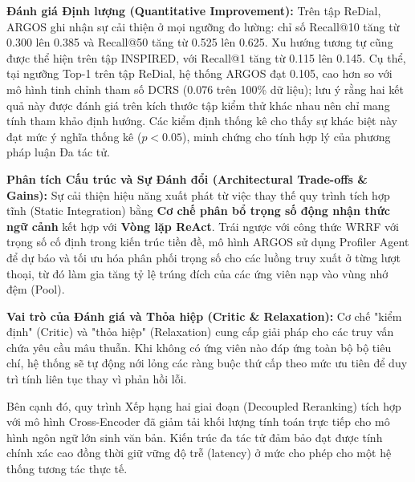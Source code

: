 \textbf{Đánh giá Định lượng (Quantitative Improvement):}
Trên tập ReDial, ARGOS ghi nhận sự cải thiện ở mọi ngưỡng đo lường: chỉ số Recall@10 tăng từ 0.300 lên 0.385 và Recall@50 tăng từ 0.525 lên 0.625. Xu hướng tương tự cũng được thể hiện trên tập INSPIRED, với Recall@1 tăng từ 0.115 lên 0.145. Cụ thể, tại ngưỡng Top-1 trên tập ReDial, hệ thống ARGOS đạt 0.105, cao hơn so với mô hình tinh chỉnh tham số DCRS (0.076 trên 100\% dữ liệu); lưu ý rằng hai kết quả này được đánh giá trên kích thước tập kiểm thử khác nhau nên chỉ mang tính tham khảo định hướng. Các kiểm định thống kê cho thấy sự khác biệt này đạt mức ý nghĩa thống kê ($p < 0.05$), minh chứng cho tính hợp lý của phương pháp luận Đa tác tử.

\textbf{Phân tích Cấu trúc và Sự Đánh đổi (Architectural Trade-offs \& Gains):}
Sự cải thiện hiệu năng xuất phát từ việc thay thế quy trình tích hợp tĩnh (Static Integration) bằng \textbf{Cơ chế phân bổ trọng số động nhận thức ngữ cảnh} kết hợp với \textbf{Vòng lặp ReAct}. Trái ngược với công thức WRRF với trọng số cố định trong kiến trúc tiền đề, mô hình ARGOS sử dụng Profiler Agent để dự báo và tối ưu hóa phân phối trọng số cho các luồng truy xuất ở từng lượt thoại, từ đó làm gia tăng tỷ lệ trúng đích của các ứng viên nạp vào vùng nhớ đệm (Pool).

\textbf{Vai trò của Đánh giá và Thỏa hiệp (Critic \& Relaxation):}
Cơ chế "kiểm định" (Critic) và "thỏa hiệp" (Relaxation) cung cấp giải pháp cho các truy vấn chứa yêu cầu mâu thuẫn. Khi không có ứng viên nào đáp ứng toàn bộ bộ tiêu chí, hệ thống sẽ tự động nới lỏng các ràng buộc thứ cấp theo mức ưu tiên để duy trì tính liên tục thay vì phản hồi lỗi. 

Bên cạnh đó, quy trình Xếp hạng hai giai đoạn (Decoupled Reranking) tích hợp với mô hình Cross-Encoder đã giảm tải khối lượng tính toán trực tiếp cho mô hình ngôn ngữ lớn sinh văn bản. Kiến trúc đa tác tử đảm bảo đạt được tính chính xác cao đồng thời giữ vững độ trễ (latency) ở mức cho phép cho một hệ thống tương tác thực tế.

